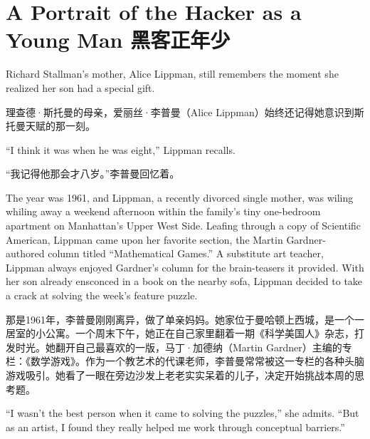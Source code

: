 
\chapter{\ifdefined\eng
A Portrait of the Hacker as a Young Man
\fi
\ifdefined\chs
黑客正年少
\fi}
\ifdefined\eng
{}
\fi
\thispagestyle{empty}
\ifdefined\eng
Richard Stallman's mother, Alice Lippman, still remembers the moment she realized her son had a special gift.
\fi

\ifdefined\chs
理查德·斯托曼的母亲，爱丽丝·李普曼（Alice Lippman）始终还记得她意识到斯托曼天赋的那一刻。
\fi

\ifdefined\eng
``I think it was when he was eight,'' Lippman recalls.
\fi

\ifdefined\chs
``我记得他那会才八岁。''李普曼回忆着。
\fi

\ifdefined\eng
The year was 1961, and Lippman, a recently divorced single mother, was \ifdefined\vone wiling \fi\ifdefined\vtwo whiling \fi away a weekend afternoon within the family's tiny one-bedroom apartment on Manhattan's Upper West Side. Leafing through a copy of Scientific American, Lippman came upon her favorite section, the Martin Gardner-authored column titled ``Mathematical Games.'' A substitute art teacher, Lippman always enjoyed Gardner's column for the brain-teasers it provided. With her son already ensconced in a book on the nearby sofa, Lippman decided to take a crack at solving the week's feature puzzle.
\fi

\ifdefined\chs
那是1961年，李普曼刚刚离异，做了单亲妈妈。她家位于曼哈顿上西城，是一个一居室的小公寓。一个周末下午，她正在自己家里翻着一期《科学美国人》杂志，打发时光。她翻开自己最喜欢的一版，马丁·加德纳（Martin Gardner）主编的专栏：《数学游戏》。作为一个教艺术的代课老师，李普曼常常被这一专栏的各种头脑游戏吸引。她看了一眼在旁边沙发上老老实实呆着的儿子，决定开始挑战本周的思考题。
\fi

\ifdefined\eng
``I wasn't the best person when it came to solving the puzzles,'' she admits. ``But as an artist, I found they really helped me work through conceptual barriers.''
\fi

